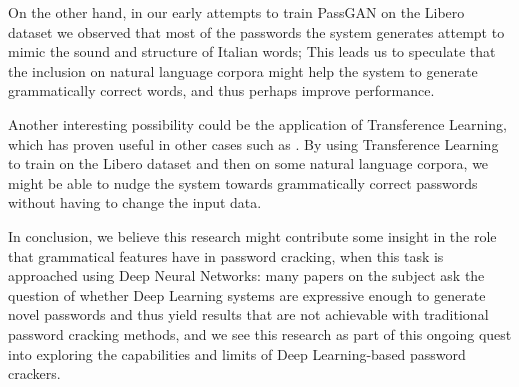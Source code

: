 On the other hand, in our early attempts to train PassGAN on the Libero dataset we observed that most of the passwords the system generates attempt to mimic the sound and structure of Italian words; This leads us to speculate that the inclusion on natural language corpora might help the system to generate grammatically correct words, and thus perhaps improve performance.

Another interesting possibility could be the application of Transference Learning, which has proven useful in other cases such as \cite{Melicher2016}. By using Transference Learning to train on the Libero dataset and then on some natural language corpora, we might be able to nudge the system towards grammatically correct passwords without having to change the input data.\newline 
 
In conclusion, we believe this research might contribute some insight in the role that grammatical features have in password cracking, when this task is approached using Deep Neural Networks: many papers on the subject ask the question of whether Deep Learning systems are expressive enough to generate novel passwords and thus yield results that are not achievable with traditional password cracking methods, and we see this research as part of this ongoing quest into exploring the capabilities and limits of Deep Learning-based password crackers.

